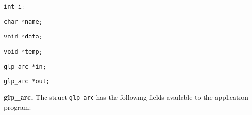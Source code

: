 \noindent
\verb|int i;|

\begin{comment}Ordinal number of the vertex, $1\leq i\leq nv$. Note
that element $v[i]$ in the struct \verb|glp_graph| points to the vertex,
whose ordinal number is $i$.
\end{comment}

\medskip

\noindent
\verb|char *name;|

\begin{comment}Symbolic name assigned to the vertex. It is a pointer to
a null terminated character string of length from 1 to 255 characters.
If no name is assigned to the vertex, this field contains \verb|NULL|.
\end{comment}

\medskip

\noindent
\verb|void *data;|

\begin{comment}Pointer to a data block associated with the vertex. This
data block is automatically allocated on creating a new vertex and freed
on deleting the vertex. If $v\_size=0$, the block is not allocated, and
this field contains \verb|NULL|.
\end{comment}

\medskip

\noindent
\verb|void *temp;|

\begin{comment}Working pointer, which may be used freely for any
purposes. The application program can change this field directly.
\end{comment}

\medskip

\noindent
\verb|glp_arc *in;|

\begin{comment}Pointer to the (unordered) list of incoming arcs. If the
vertex has no incoming arcs, this field contains \verb|NULL|.
\end{comment}

\medskip

\noindent
\verb|glp_arc *out;|

\begin{comment}Pointer to the (unordered) list of outgoing arcs. If the
vertex has no outgoing arcs, this field contains \verb|NULL|.
\end{comment}

\bigskip

\noindent
{\bf glp\_arc.} The struct \verb|glp_arc| has the following fields
available to the application program:

